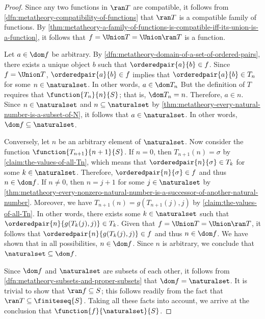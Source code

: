 \begin{proof}
    \vspace{0.3cm}
    \noindent
    Since any two functions in \( \ran T \) are compatible, it follows from \cref{dfn:metatheory-compatibility-of-functions} that \( \ran T \)
    is a compatible family of functions. By \cref{thm:metatheory-a-family-of-functions-is-compatible-iff-its-union-is-a-function}, it follows
    that \( f = \Union T = \Union \ran T \) is a function.

    \vspace{0.3cm}
    \noindent
    Let \( a \in \dom f \) be arbitrary.
    By \cref{dfn:metatheory-domain-of-a-set-of-ordered-pairs}, there exists a unique object \( b \) such that \( \orderedpair{a}{b} \in f \).
    Since \( f = \Union T \), \( \orderedpair{a}{b} \in f \) implies that \( \orderedpair{a}{b} \in T_{n} \) for some \( n \in \naturalset \).
    In other words, \( a \in \dom T_{n} \)
    But the definition of \( T \) requires that \( \function{T_{n}}{n}{S} \); that is, \( \dom T_{n} = n \).
    Therefore, \( a \in n \).
    Since \( n \in \naturalset \) and \( n \subseteq \naturalset \) by \cref{thm:metatheory-every-natural-number-is-a-subset-of-N},
    it follows that \( a \in \naturalset \).
    In other words, \( \dom f \subseteq \naturalset \).

    \vspace{0.3cm}
    \noindent
    Conversely, let \( n \) be an arbitrary element of \( \naturalset \).
    Now consider the function \( \function{T_{n+1}}{n+1}{S} \).
    If \( n = 0 \), then \( T_{n+1}(n) = \sigma \) by \cref{claim:the-values-of-all-Tn}, which means that \( \orderedpair{n}{\sigma} \in T_{k} \) for some \( k \in \naturalset \).
    Therefore, \( \orderedpair{n}{\sigma} \in f \) and thus \( n \in \dom f \).
    If \( n \neq 0 \), then \( n = j + 1 \) for some \( j \in \naturalset \) by \cref{thm:metatheory-every-nonzero-natural-number-is-a-successor-of-another-natural-number}.
    Moreover, we have \( T_{n+1}(n) = g(T_{n+1}(j), j) \) by \cref{claim:the-values-of-all-Tn}.
    In other words, there exists some \( k \in \naturalset \) such that \( \orderedpair{n}{g(T_{k}(j), j)} \in T_{k} \).
    Given that \( f = \Union T = \Union \ran T \), it follows that \( \orderedpair{n}{g(T_{k}(j), j)} \in f \) and thus \( n \in \dom f \).
    We have shown that in all possibilities, \( n \in \dom f \).
    Since \( n \) is arbitrary, we conclude that \( \naturalset \subseteq \dom f \).

    \vspace{0.3cm}
    \noindent
    Since \( \dom f \) and \( \naturalset \) are subsets of each other, it follows from \cref{dfn:metatheory-subsets-and-proper-subsets} that
    \( \dom f = \naturalset \).
    It is trivial to show that \( \ran f \subseteq S \); this follows readily from the fact that \( \ran T \subseteq \finiteseq{S} \).
    Taking all these facts into account, we arrive at the conclusion that \( \function{f}{\naturalset}{S} \).


\end{proof}
